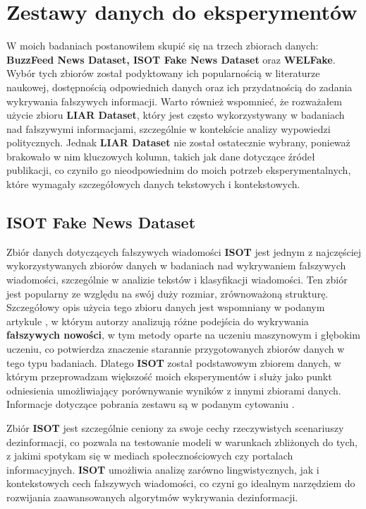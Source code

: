 \section{Zestawy danych do eksperymentów}

W moich badaniach postanowiłem skupić się na trzech zbiorach danych: \textbf{BuzzFeed News Dataset, ISOT Fake News Dataset} oraz \textbf{WELFake}. Wybór tych zbiorów został podyktowany ich popularnością w literaturze naukowej, dostępnością odpowiednich danych oraz ich przydatnością do zadania wykrywania fałszywych informacji. Warto również wspomnieć, że rozważałem użycie zbioru \textbf{LIAR Dataset}, który jest często wykorzystywany w badaniach nad fałszywymi informacjami, szczególnie w kontekście analizy wypowiedzi politycznych. Jednak \textbf{LIAR Dataset} nie został ostatecznie wybrany, ponieważ brakowało w nim kluczowych kolumn, takich jak dane dotyczące źródeł publikacji, co czyniło go nieodpowiednim do moich potrzeb eksperymentalnych, które wymagały szczegółowych danych tekstowych i kontekstowych.

\subsection{ISOT Fake News Dataset}
Zbiór danych dotyczących fałszywych wiadomości \textbf{ISOT} jest jednym z najczęściej wykorzystywanych zbiorów danych w badaniach nad wykrywaniem fałszywych wiadomości, szczególnie w analizie tekstów i klasyfikacji wiadomości. Ten zbiór jest popularny ze względu na swój duży rozmiar, zrównoważoną strukturę. Szczegółowy opis użycia tego zbioru danych jest wspomniany w podanym artykule \cite{ISOT}, w którym autorzy analizują różne podejścia do wykrywania \textbf{fałszywych nowości}, w tym metody oparte na uczeniu maszynowym i głębokim uczeniu, co potwierdza znaczenie starannie przygotowanych zbiorów danych w tego typu badaniach. Dlatego \textbf{ISOT} został podstawowym zbiorem danych, w którym przeprowadzam większość moich eksperymentów i służy jako punkt odniesienia umożliwiający porównywanie wyników z innymi zbiorami danych. Informacje dotyczące pobrania zestawu są w podanym cytowaniu \cite{isot_fake_news_dataset}.

Zbiór \textbf{ISOT} jest szczególnie ceniony za swoje cechy rzeczywistych scenariuszy dezinformacji, co pozwala na testowanie modeli w warunkach zbliżonych do tych, z jakimi spotykam się w mediach społecznościowych czy portalach informacyjnych. \textbf{ISOT} umożliwia analizę zarówno lingwistycznych, jak i kontekstowych cech fałszywych wiadomości, co czyni go idealnym narzędziem do rozwijania zaawansowanych algorytmów wykrywania dezinformacji.

